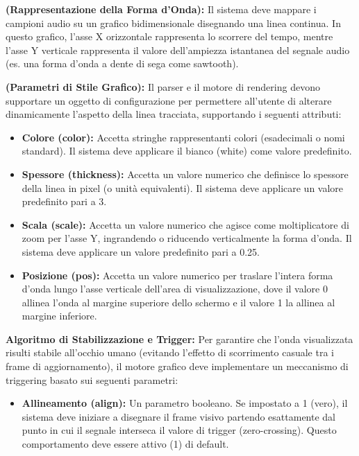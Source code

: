 \begin{description}[leftmargin=0.5cm, itemsep=0.8em]
    \textbf{(Rappresentazione della Forma d'Onda):} Il sistema deve mappare i campioni audio su un grafico
    bidimensionale disegnando una linea continua. In questo grafico, l'asse X orizzontale rappresenta lo
    scorrere del tempo, mentre l'asse Y verticale rappresenta il valore dell'ampiezza istantanea del segnale
    audio (es. una forma d'onda a dente di sega come sawtooth).


    \textbf{(Parametri di Stile Grafico):} Il parser e il motore di rendering devono
    supportare un oggetto di configurazione per permettere all'utente di alterare dinamicamente
    l'aspetto della linea tracciata, supportando i seguenti attributi:

    \begin{itemize}
        \item\textbf{Colore (color):} Accetta stringhe rappresentanti colori (esadecimali o nomi standard).
    Il sistema deve applicare il bianco (white) come valore predefinito.


    \item \textbf{Spessore (thickness):} Accetta un valore numerico che definisce lo spessore della linea in pixel (o unità equivalenti). Il sistema deve applicare un valore predefinito pari a 3.


    \item \textbf{Scala (scale):} Accetta un valore numerico che agisce come moltiplicatore di zoom per l'asse Y, ingrandendo o riducendo verticalmente la forma d'onda. Il sistema deve applicare un valore predefinito pari a 0.25.


    \item \textbf{Posizione (pos):} Accetta un valore numerico per traslare l'intera forma d'onda lungo l'asse verticale dell'area di visualizzazione, dove il valore 0 allinea l'onda al margine superiore dello schermo e il valore 1 la allinea al margine inferiore.


    \end{itemize}

    \textbf{Algoritmo di Stabilizzazione e Trigger:} Per garantire che l'onda visualizzata risulti stabile
    all'occhio umano (evitando l'effetto di scorrimento casuale tra i frame di aggiornamento), il motore
    grafico deve implementare un meccanismo di triggering basato sui seguenti parametri:

    \begin{itemize}
    \item \textbf{Allineamento (align):} Un parametro booleano. Se impostato a 1 (vero), il sistema deve iniziare
    a disegnare il frame visivo partendo esattamente dal punto in cui il segnale interseca il valore di trigger
    (zero-crossing). Questo comportamento deve essere attivo (1) di default.



\end{itemize}
\end{description}

